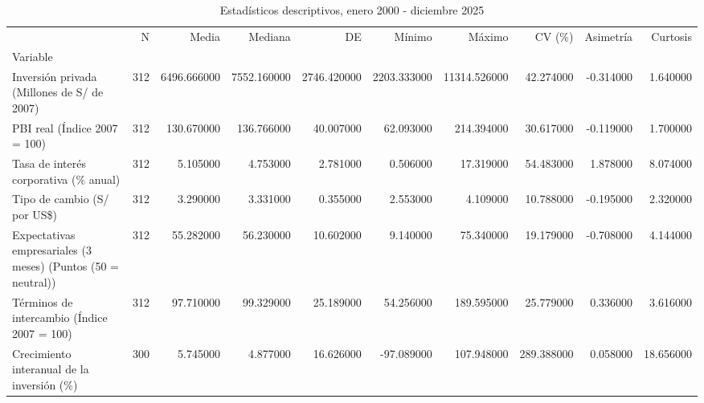 \begin{table}
\caption{Estadísticos descriptivos, enero 2000 - diciembre 2025}
\label{tab:tabla2_descriptivos}
\begin{tabular}{lrrrrrrrrr}
\toprule
 & N & Media & Mediana & DE & Mínimo & Máximo & CV (\%) & Asimetría & Curtosis \\
Variable &  &  &  &  &  &  &  &  &  \\
\midrule
Inversión privada (Millones de S/ de 2007) & 312 & 6496.666000 & 7552.160000 & 2746.420000 & 2203.333000 & 11314.526000 & 42.274000 & -0.314000 & 1.640000 \\
PBI real (Índice 2007 = 100) & 312 & 130.670000 & 136.766000 & 40.007000 & 62.093000 & 214.394000 & 30.617000 & -0.119000 & 1.700000 \\
Tasa de interés corporativa (\% anual) & 312 & 5.105000 & 4.753000 & 2.781000 & 0.506000 & 17.319000 & 54.483000 & 1.878000 & 8.074000 \\
Tipo de cambio (S/ por US\$) & 312 & 3.290000 & 3.331000 & 0.355000 & 2.553000 & 4.109000 & 10.788000 & -0.195000 & 2.320000 \\
Expectativas empresariales (3 meses) (Puntos (50 = neutral)) & 312 & 55.282000 & 56.230000 & 10.602000 & 9.140000 & 75.340000 & 19.179000 & -0.708000 & 4.144000 \\
Términos de intercambio (Índice 2007 = 100) & 312 & 97.710000 & 99.329000 & 25.189000 & 54.256000 & 189.595000 & 25.779000 & 0.336000 & 3.616000 \\
Crecimiento interanual de la inversión (\%) & 300 & 5.745000 & 4.877000 & 16.626000 & -97.089000 & 107.948000 & 289.388000 & 0.058000 & 18.656000 \\
\bottomrule
\end{tabular}
\end{table}
